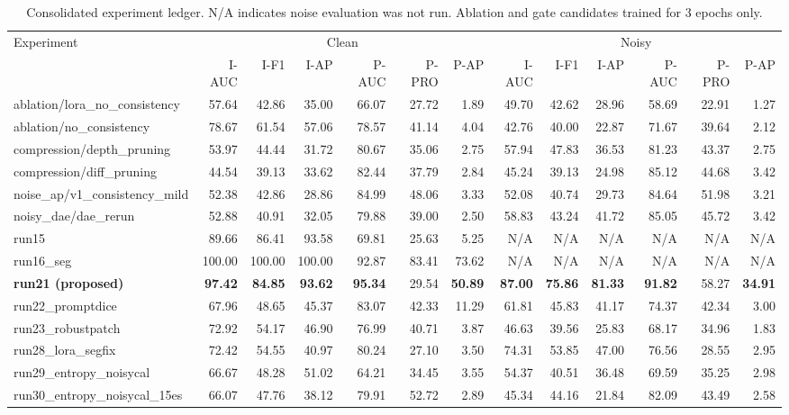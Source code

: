 \documentclass[11pt]{article}
\begin{document}
\begin{table}[t]
\centering
\caption{Consolidated experiment ledger. N/A indicates noise evaluation was not run. Ablation and gate candidates trained for 3 epochs only.}
\label{tab:allruns}
\setlength{\tabcolsep}{3.5pt}
\small
\begin{tabular}{lrrrrrrrrrrrr}
\toprule
Experiment & \multicolumn{6}{c}{Clean} & \multicolumn{6}{c}{Noisy} \\
\cmidrule(lr){2-7}\cmidrule(lr){8-13}
 & I-AUC & I-F1 & I-AP & P-AUC & P-PRO & P-AP & I-AUC & I-F1 & I-AP & P-AUC & P-PRO & P-AP \\
\midrule
ablation/lora\_no\_consistency  & 57.64 & 42.86 & 35.00 & 66.07 & 27.72 & 1.89 & 49.70 & 42.62 & 28.96 & 58.69 & 22.91 & 1.27 \\
ablation/no\_consistency        & 78.67 & 61.54 & 57.06 & 78.57 & 41.14 & 4.04 & 42.76 & 40.00 & 22.87 & 71.67 & 39.64 & 2.12 \\
compression/depth\_pruning      & 53.97 & 44.44 & 31.72 & 80.67 & 35.06 & 2.75 & 57.94 & 47.83 & 36.53 & 81.23 & 43.37 & 2.75 \\
compression/diff\_pruning       & 44.54 & 39.13 & 33.62 & 82.44 & 37.79 & 2.84 & 45.24 & 39.13 & 24.98 & 85.12 & 44.68 & 3.42 \\
noise\_ap/v1\_consistency\_mild & 52.38 & 42.86 & 28.86 & 84.99 & 48.06 & 3.33 & 52.08 & 40.74 & 29.73 & 84.64 & 51.98 & 3.21 \\
noisy\_dae/dae\_rerun           & 52.88 & 40.91 & 32.05 & 79.88 & 39.00 & 2.50 & 58.83 & 43.24 & 41.72 & 85.05 & 45.72 & 3.42 \\
run15                           & 89.66 & 86.41 & 93.58 & 69.81 & 25.63 & 5.25 & N/A & N/A & N/A & N/A & N/A & N/A \\
run16\_seg                      & 100.00 & 100.00 & 100.00 & 92.87 & 83.41 & 73.62 & N/A & N/A & N/A & N/A & N/A & N/A \\
\textbf{run21 (proposed)}       & \textbf{97.42} & \textbf{84.85} & \textbf{93.62} & \textbf{95.34} & 29.54 & \textbf{50.89} & \textbf{87.00} & \textbf{75.86} & \textbf{81.33} & \textbf{91.82} & 58.27 & \textbf{34.91} \\
run22\_promptdice               & 67.96 & 48.65 & 45.37 & 83.07 & 42.33 & 11.29 & 61.81 & 45.83 & 41.17 & 74.37 & 42.34 & 3.00 \\
run23\_robustpatch              & 72.92 & 54.17 & 46.90 & 76.99 & 40.71 & 3.87 & 46.63 & 39.56 & 25.83 & 68.17 & 34.96 & 1.83 \\
run28\_lora\_segfix             & 72.42 & 54.55 & 40.97 & 80.24 & 27.10 & 3.50 & 74.31 & 53.85 & 47.00 & 76.56 & 28.55 & 2.95 \\
run29\_entropy\_noisycal        & 66.67 & 48.28 & 51.02 & 64.21 & 34.45 & 3.55 & 54.37 & 40.51 & 36.48 & 69.59 & 35.25 & 2.98 \\
run30\_entropy\_noisycal\_15es  & 66.07 & 47.76 & 38.12 & 79.91 & 52.72 & 2.89 & 45.34 & 44.16 & 21.84 & 82.09 & 43.49 & 2.58 \\
\bottomrule
\end{tabular}
\end{table}
\end{document}
